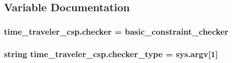 \subsection{Variable Documentation}
\hypertarget{namespacetime__traveler__csp_ab418b437e882e3a11b98fd6e05123d0b}{}
\subsubsection[{checker}]{\setlength{\rightskip}{0pt plus 5cm}time\+\_\+traveler\+\_\+csp.\+checker = basic\+\_\+constraint\+\_\+checker}\label{namespacetime__traveler__csp_ab418b437e882e3a11b98fd6e05123d0b}
\hypertarget{namespacetime__traveler__csp_a511b1971c24cb060fc42bf2d0d07a07a}{}
\subsubsection[{checker\+\_\+type}]{\setlength{\rightskip}{0pt plus 5cm}string time\+\_\+traveler\+\_\+csp.\+checker\+\_\+type = sys.\+argv\mbox{[}1\mbox{]}}\label{namespacetime__traveler__csp_a511b1971c24cb060fc42bf2d0d07a07a}
